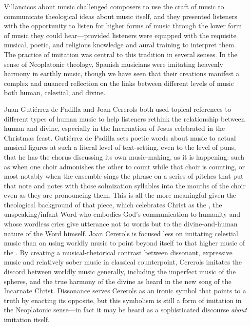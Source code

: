 
Villancicos about music challenged composers to use the craft of music to
communicate theological ideas about music itself, and they presented listeners
with the opportunity to listen for higher forms of music through the lower form
of music they could hear---provided listeners were equipped with the requisite
musical, poetic, and religious knowledge and aural training to interpret them.
The practice of imitation was central to this tradition in several senses. 
In the sense of Neoplatonic theology, Spanish musicians were imitating heavenly
harmony in earthly music, though we have seen that their creations manifest a
complex and nuanced reflection on the links between different levels of music
both human, celestial, and divine.

Juan Gutiérrez de Padilla and Joan Cererols both used topical references to
different types of human music to help listeners rethink the relationship
between human and divine, especially in the Incarnation of Jesus celebrated in
the Christmas feast.
Gutiérrez de Padilla sets poetic words about music to actual musical figures at
such a literal level of text-setting, even to the level of puns, that he has
the chorus discussing its own music-making, as it is happening: such as when
one choir admonishes the other to count while that choir is counting, or most
notably when the ensemble sings the phrase  on a series of
pitches that put that note and notes with those solmization syllables into the
mouths of the choir even as they are pronouncing them.
This is all the more meaningful given the theological background of that piece,
which celebrates Christ as the , the unspeaking/infant Word
who embodies God's communication to humanity and whose wordless cries give
utterance not to words but to the divine-and-human nature of the Word himself.
Joan Cererols is focused less on imitating celestial music than on using
worldly music to point beyond itself to that higher music of the .
By creating a musical-rhetorical contrast between dissonant, expressive music
and relatively sober music in classical counterpoint, Cererols imitates the
discord between worldly music generally, including the imperfect music of the
spheres, and the true harmony of the divine as heard in the new song of the
Incarnate Christ.
Dissonance serves Cererols as an ironic symbol that points to a truth by
enacting its opposite, but this symbolism is still a form of imitation in the
Neoplatonic sense---in fact it may be heard as a sophisticated discourse
\emph{about} imitation itself.

